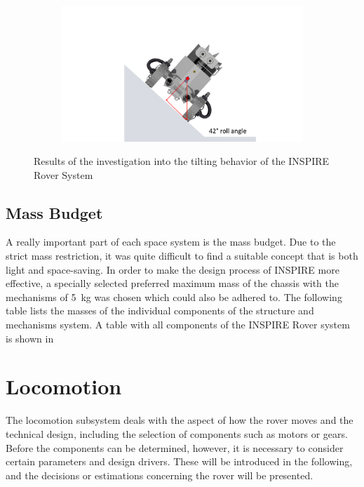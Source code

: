 \begin{figure}[htb]
\begin{subfigure}[b]{0.49\textwidth}
         \label{fig:stat2}
     \end{subfigure}
     \hfill
     \begin{subfigure}[b]{0.49\textwidth}
         \centering
         \includegraphics[width=\textwidth]{Media/Static3.pdf}
         \label{fig:stat3}
     \end{subfigure}
     \caption{Results of the investigation into the tilting behavior of the INSPIRE Rover System}
     \label{fig:StaticAnal}
\end{figure}

\subsection{Mass Budget}

A really important part of each space system is the mass budget. Due to the strict mass restriction, it was quite difficult to find a suitable concept that is both light and space-saving. In order to make the design process of INSPIRE more effective, a specially selected preferred maximum mass of the chassis with the mechanisms of 5~kg was chosen which could also be adhered to. The following table lists the masses of the individual components of the structure and mechanisms system. 
A table with all components of the INSPIRE Rover system is shown in %

\section{Locomotion} \label{sec:locomotion}

The locomotion subsystem deals with the aspect of how the rover moves and the technical design, including the selection of components such as motors or gears. Before the components can be determined, however, it is necessary to consider certain parameters and design drivers. These will be introduced in the following, and the decisions or estimations concerning the rover will be presented.

